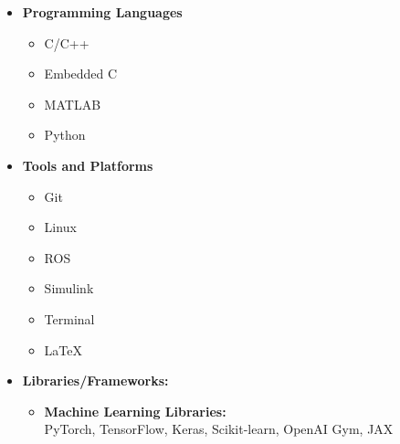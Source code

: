 \documentclass[12pt]{article}
\begin{document}
\begin{itemize}
	\item \textbf{Programming Languages}\itemsep -4pt
	\begin{multicols}{4}
		\begin{itemize}
			\item C/C++
			\item Embedded C
			\item MATLAB
			\item Python \faPython
		\end{itemize}
	\end{multicols}
	\item \textbf{Tools and Platforms}	
	\begin{multicols}{3}
		\begin{itemize}
			\item Git \faGitSquare
			\item Linux \faLinux
			\item ROS
			\item Simulink
			\item Terminal \faTerminal
			\item \LaTeX
		\end{itemize}
	\end{multicols}
	\item \textbf{Libraries/Frameworks:} 
	\begin{itemize}
		\item \textbf{Machine Learning Libraries:}\\
		PyTorch, TensorFlow, Keras, Scikit-learn, OpenAI Gym, JAX
	

\end{itemize}
\end{itemize}
\end{document}
